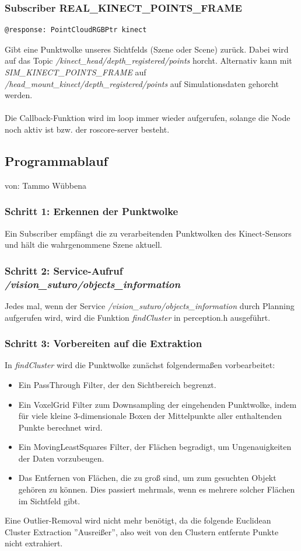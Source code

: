 \documentclass{suturo}
\makeatletter
\newcommand{\chapterauthor}[1]{%
  {\parindent0pt\vspace*{-27pt}%
  \linespread{0}\small\begin{flushright}von: #1\end{flushright}%
  \par\nobreak\vspace*{0pt}}
  \@afterheading%
}
\makeatother
\begin{document}
\subsubsection{Subscriber REAL\_KINECT\_POINTS\_FRAME}
\begin{verbatim}
@response: PointCloudRGBPtr kinect
\end{verbatim}
Gibt eine Punktwolke unseres Sichtfelds (Szene oder Scene) zurück. Dabei wird auf das Topic \textit{/kinect\_head/depth\_registered/points} horcht. Alternativ kann mit \textit{SIM\_KINECT\_POINTS\_FRAME} auf \textit{/head\_mount\_kinect/depth\_registered/points} auf Simulationsdaten gehorcht werden.
\\ \\
Die Callback-Funktion wird im loop immer wieder aufgerufen, solange die Node noch aktiv ist bzw. der roscore-server besteht.

\subsection{Programmablauf}
\chapterauthor{Tammo Wübbena}
\subsubsection{Schritt 1: Erkennen der Punktwolke}
Ein Subscriber empfängt die zu verarbeitenden Punktwolken des Kinect-Sensors und hält die wahrgenommene Szene aktuell.
\subsubsection{Schritt 2: Service-Aufruf \textit{/vision\_suturo/objects\_information}}
Jedes mal, wenn der Service \textit{/vision\_suturo/objects\_information} durch Planning aufgerufen wird, wird die Funktion \textit{findCluster} in perception.h ausgeführt. 
\subsubsection{Schritt 3: Vorbereiten auf die Extraktion} 
In \textit{findCluster} wird die Punktwolke zunächst folgendermaßen vorbearbeitet:

\begin{itemize} 
\item Ein PassThrough Filter, der den Sichtbereich begrenzt.
\item Ein VoxelGrid Filter zum Downsampling der eingehenden Punktwolke, indem für viele kleine 3-dimensionale Boxen der Mittelpunkte aller enthaltenden Punkte berechnet wird.
\item Ein MovingLeastSquares Filter, der Flächen begradigt, um Ungenauigkeiten der Daten vorzubeugen.
\item Das Entfernen von Flächen, die zu groß sind, um zum gesuchten Objekt gehören zu können. Dies passiert mehrmals, wenn es mehrere solcher Flächen im Sichtfeld gibt.
\end{itemize}
Eine Outlier-Removal wird nicht mehr benötigt, da die folgende Euclidean Cluster Extraction ''Ausreißer'', also weit von den Clustern entfernte Punkte nicht extrahiert.\\
\end{document}

